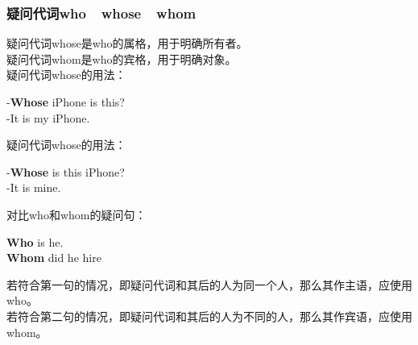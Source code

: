 \documentclass[UTF8]{ctexart}
\newcommand{\littf}[1]{{\hspace{3pt}\ttfamily #1}}
\begin{document}
\subsubsection{疑问代词\littf{who}~~\littf{whose}~~\littf{whom}}
    疑问代词\littf{whose}是\littf{who}的属格，用于明确所有者。\\[3mm]
    疑问代词\littf{whom\hphantom{x}}是\littf{who}的宾格，用于明确对象。\\[3mm]
    疑问代词\littf{whose}的用法：
    \begin{center}
        \large\ttfamily
        -\textbf{Whose} iPhone is this?\\[3mm]
        -It is my iPhone.\hphantom{xxxxx}\\[6mm]
    \end{center}
    疑问代词\littf{whose}的用法：
    \begin{center}
        \large\ttfamily
        -\textbf{Whose} is this iPhone?\\[3mm]
        -It is mine.\hphantom{xxxxxxxxxxx}\\[6mm]
    \end{center}
    对比\littf{who}和\littf{whom}的疑问句：
    \begin{center}
        \large\ttfamily
        \textbf{Who} is he.\\[3mm]
        \textbf{Whom} did he hire\\[6mm]
    \end{center}
    若符合第一句的情况，即疑问代词和其后的人为同一个人，那么其作主语，应使用\littf{who}。\\[3mm]
    若符合第二句的情况，即疑问代词和其后的人为不同的人，那么其作宾语，应使用\littf{whom}。

\newpage
\end{document}
